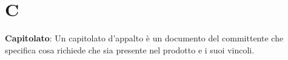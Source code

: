 \section{C}
\textbf{Capitolato}: Un capitolato d’appalto è un documento del committente che specifica cosa richiede che
sia presente nel prodotto e i suoi vincoli.\\
